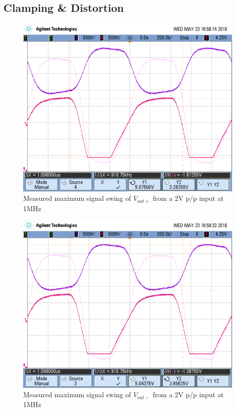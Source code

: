 \subsection{Clamping \& Distortion}

\FloatBarrier

\begin{figure}[h!]
	\centering
	\includegraphics[scale=0.50]{./images/scope_7}
	\caption{Measured maximum signal swing of $V_{out+}$ from a 2\si{\volt} p/p input at 1MHz}
	\label{fig:scope_7}
\end{figure}

\FloatBarrier

\begin{figure}[h!]
	\centering
	\includegraphics[scale=0.50]{./images/scope_8}
	\caption{Measured maximum signal swing of $V_{out-}$ from a 2\si{\volt} p/p input at 1MHz}
	\label{fig:scope_8}
\end{figure}

